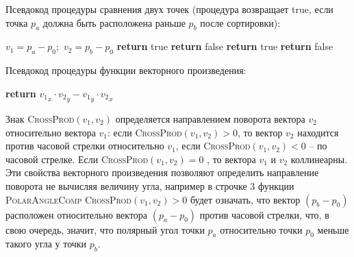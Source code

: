 \newpage

\noindent Псевдокод процедуры сравнения двух точек (процедура возвращает true, если точка $p_a$ должна быть расположена раньше $p_b$ после сортировки):
\begin{algorithmic}[1]
		\State $v_1 = p_a - p_0;$ $v_2 = p_b - p_0$
			\State \textbf{return} true
			\State \textbf{return} false
		\Else
				\State \textbf{return} true
			\Else
				\State \textbf{return} false
			\EndIf
		\EndIf
	\EndProcedure
\end{algorithmic}

\noindent Псевдокод процедуры функции векторного произведения:
\begin{algorithmic}[1]
		\State \textbf{return} ${v_1}_x \cdot {v_2}_y - {v_1}_y \cdot {v_2}_x$
	\EndProcedure
\end{algorithmic}

Знак \textsc{CrossProd}$(v_1, v_2)$ определяется направлением поворота вектора $v_2$ относительно вектора $v_1$: если \textsc{CrossProd}$(v_1, v_2) > 0$, то вектор $v_2$ находится против часовой стрелки относительно $v_1$, если \textsc{CrossProd}$(v_1, v_2) < 0$ -- по часовой стрелке. Если \textsc{CrossProd}$(v_1, v_2)=0$ , то вектора $v_1$ и $v_2$ коллинеарны. Эти свойства векторного произведения позволяют определить направление поворота не вычисляя величину угла, например в строчке 3 функции \textsc{PolarAngleComp} \textsc{CrossProd}$(v_1, v_2) > 0$ будет означать, что вектор $(p_b-p_0)$ расположен относительно вектора $(p_a-p_0)$ против часовой стрелки, что, в свою очередь, значит, что полярный угол точки $p_a$ относительно точки $p_0$ меньше такого угла у точки $p_b$\footnotemark{}.


\newpage

